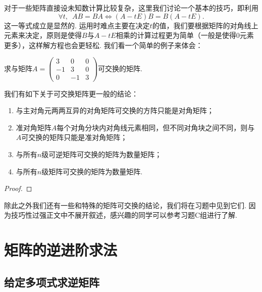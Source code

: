 对于一些矩阵直接设未知数计算比较复杂，这里我们讨论一个基本的技巧，即利用
\[\forall t,\enspace AB=BA \iff (A-tE)B=B(A-tE).\]
这一等式成立是显然的. 运用时难点主要在决定$t$的值，我们要根据矩阵的对角线上元素来决定，原则是使得$B$与$A-tE$相乘的计算过程更为简单（一般是使得0元素更多），这样解方程也会更轻松. 我们看一个简单的例子来体会：
\begin{example}
    求与矩阵$A=\begin{pmatrix}
            3  & 0  & 0 \\
            -1 & 3  & 0 \\
            0  & -1 & 3
        \end{pmatrix}$可交换的矩阵.
\end{example}

\begin{solution}

\end{solution}

\begin{theorem}
    我们有如下关于可交换矩阵更一般的结论：
    \begin{enumerate}
        \item 与主对角元两两互异的对角矩阵可交换的方阵只能是对角矩阵；

        \item 准对角矩阵$A$每个对角分块内对角线元素相同，但不同对角块之间不同，则与$A$可交换的矩阵只能是准对角矩阵；

        \item 与所有$n$级可逆矩阵可交换的矩阵为数量矩阵；

        \item 与所有$n$级矩阵可交换的矩阵为数量矩阵.
    \end{enumerate}
\end{theorem}

\begin{proof}

\end{proof}

除此之外我们还有一些和特殊的矩阵可交换的结论，我们将在习题中见到它们. 因为技巧性过强正文中不展开叙述，感兴趣的同学可以参考习题C组进行了解.

\section{矩阵的逆进阶求法}

\subsection{给定多项式求逆矩阵}

